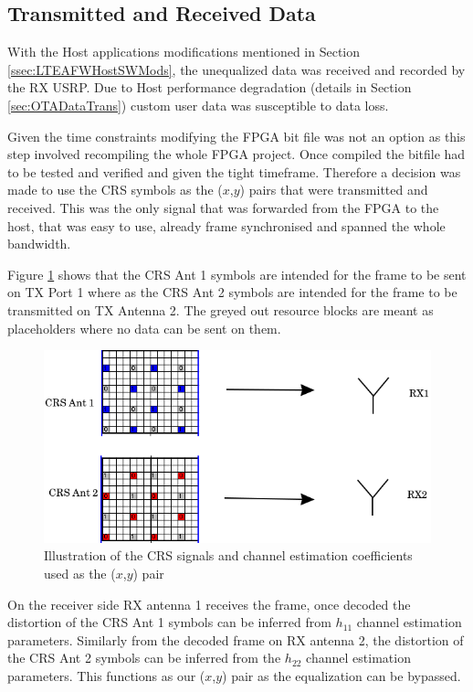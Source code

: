 \subsection{Transmitted and Received Data}\label{ssec:XYPairs}

With the Host applications modifications mentioned in Section \ref{ssec:LTEAFWHostSWMods}, the unequalized data was received and recorded by the RX USRP. Due to Host performance degradation (details in Section \ref{sec:OTADataTrans}) custom user data was susceptible to data loss.

Given the time constraints modifying the FPGA bit file was not an option as this step involved recompiling the whole FPGA project. Once compiled the bitfile had to be tested and verified and given the tight timeframe. Therefore a decision was made to use the CRS symbols as the ($x$,$y$) pairs that were transmitted and received. This was the only signal that was forwarded from the FPGA to the host, that was easy to use, already frame synchronised and spanned the whole bandwidth.

Figure \ref{fig:XYPairsCRS} shows that the CRS Ant 1 symbols are intended for the frame to be sent on TX Port 1 where as the CRS Ant 2 symbols are intended for the frame to be transmitted on TX Antenna 2. The greyed out resource blocks are meant as placeholders where no data can be sent on them.

\begin{figure}[!htb]
    \centering
    \includegraphics[width=\linewidth]{images/MultiAntennaCRSXYPairEdited.png}
    \caption{Illustration of the CRS signals and channel estimation coefficients used as the ($x$,$y$) pair}
    \label{fig:XYPairsCRS}
\end{figure}

On the receiver side RX antenna 1 receives the frame, once decoded the distortion of the CRS Ant 1 symbols can be inferred from $h_{11}$ channel estimation parameters. Similarly from the decoded frame on RX antenna 2, the distortion of the CRS Ant 2 symbols can be inferred from the $h_{22}$ channel estimation parameters. This functions as our ($x$,$y$) pair as the equalization can be bypassed.

